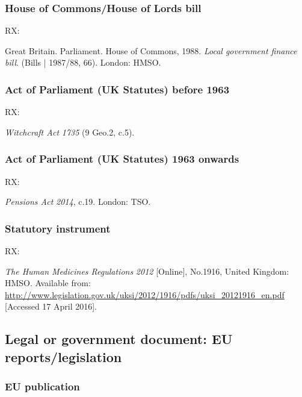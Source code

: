 \subsubsection*{House of Commons\slash House of Lords bill}

RX: \cite{gb.bill1987/88-66}

Great Britain. Parliament. House of Commons, 1988. \emph{Local government finance bill}. (Bills | 1987/88, 66). London: HMSO.



\subsubsection*{Act of Parliament (UK Statutes) before 1963}

RX: \cite{gb.wa1735}

\emph{Witchcraft Act} \emph{1735} (9 Geo.2, c.5).



\subsubsection*{Act of Parliament (UK Statutes) 1963 onwards}

RX: \cite{gb.pa2014}

\emph{Pensions Act} \emph{2014}, c.19. London: TSO.




\subsubsection*{Statutory instrument}

RX: \cite{gb.hmr2012}

\emph{The Human Medicines Regulations} \emph{2012} [Online], No.1916, United Kingdom: HMSO. Available from: \url{http://www.legislation.gov.uk/uksi/2012/1916/pdfs/uksi_20121916_en.pdf} [Accessed 17 April 2016].



\subsection{Legal or government document: EU reports\slash legislation}


\subsubsection*{EU publication}

